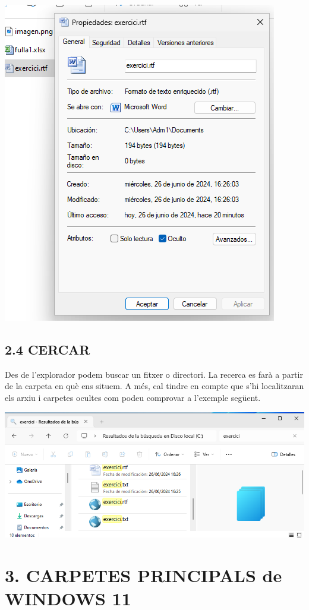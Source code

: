 \documentclass[
  a4paper,
]{article}
\begin{document}
\includegraphics{png/atributOcult.png}

\subsection{2.4 CERCAR}\label{cercar}

Des de l'explorador podem buscar un fitxer o directori. La recerca es
farà a partir de la carpeta en què ens situem. A més, cal tindre en
compte que s'hi localitzaran els arxiu i carpetes ocultes com podeu
comprovar a l'exemple següent.

\includegraphics{png/cercar.png}

\section{3. CARPETES PRINCIPALS de WINDOWS
11}\label{carpetes-principals-de-windows-11}
\end{document}
